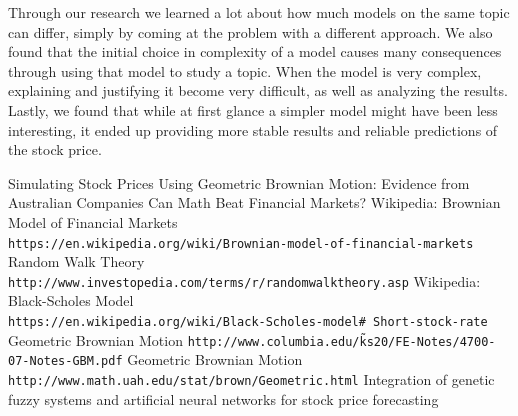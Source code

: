 \documentclass{article}
\begin{document}
Through our research we learned a lot about how much models on the same topic can differ, simply by coming at the problem with a different approach. We also found that the initial choice in complexity of a model causes many consequences through using that model to study a topic. When the model is very complex, explaining and justifying it become very difficult, as well as analyzing the results. Lastly, we found that while at first glance a simpler model might have been less interesting, it ended up providing more stable results and reliable predictions of the stock price.

\pagebreak
\begin{thebibliography}{9}
Simulating Stock Prices Using Geometric Brownian Motion: Evidence from Australian
Companies
Can Math Beat Financial Markets?
Wikipedia: Brownian Model of Financial Markets\\
\texttt{https://en.wikipedia.org/wiki/Brownian-model-of-financial-markets}
Random Walk Theory\\
\texttt{http://www.investopedia.com/terms/r/randomwalktheory.asp}
Wikipedia: Black-Scholes Model\\
\texttt{https://en.wikipedia.org/wiki/Black-Scholes-model\# Short-stock-rate}
Geometric Brownian Motion
\texttt{http://www.columbia.edu/\~ ks20/FE-Notes/4700-07-Notes-GBM.pdf}
Geometric Brownian Motion\\
\texttt{http://www.math.uah.edu/stat/brown/Geometric.html}
Integration of genetic fuzzy systems and artificial neural networks for stock price forecasting
\end{thebibliography}



	
	
	
\end{document}
